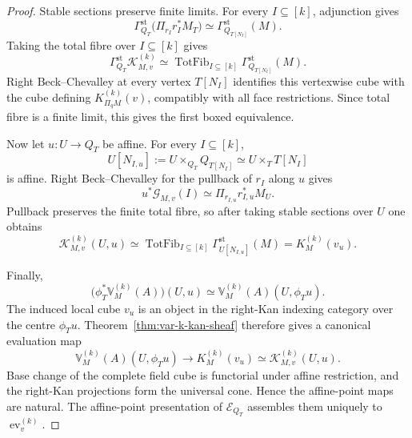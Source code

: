 \begin{proof}
Stable sections preserve finite limits. For every \(I\subseteq[k]\), adjunction gives
\[
    \Gamma_{Q_T}^{\mathrm{st}}
    \bigl(\Pi_{r_I}r_I^*M_T\bigr)
    \simeq
    \Gamma_{Q_{T[N_I]}}^{\mathrm{st}}(M).
\]
Taking the total fibre over \(I\subseteq[k]\) gives
\[
    \Gamma_{Q_T}^{\mathrm{st}}
    \mathscr K^{(k)}_{M,v}
    \simeq
    \operatorname{TotFib}_{I\subseteq[k]}
    \Gamma_{Q_{T[N_I]}}^{\mathrm{st}}(M).
\]
Right Beck--Chevalley at every vertex \(T[N_I]\) identifies this vertexwise cube with the cube defining \(K_{\Pi_qM}^{(k)}(v)\), compatibly with all face restrictions. Since total fibre is a finite limit, this gives the first boxed equivalence.

Now let \(u:U\to Q_T\) be affine. For every \(I\subseteq[k]\),
\[
    U[N_{I,u}]
    :=
    U\times_{Q_T}Q_{T[N_I]}
    \simeq
    U\times_TT[N_I]
\]
is affine. Right Beck--Chevalley for the pullback of \(r_I\) along \(u\) gives
\[
    u^*\mathscr G_{M,v}(I)
    \simeq
    \Pi_{r_{I,u}}r_{I,u}^*M_U.
\]
Pullback preserves the finite total fibre, so after taking stable sections over \(U\) one obtains
\[
    \mathscr K^{(k)}_{M,v}(U,u)
    \simeq
    \operatorname{TotFib}_{I\subseteq[k]}
    \Gamma_{U[N_{I,u}]}^{\mathrm{st}}(M)
    =
    K_M^{(k)}(v_u).
\]

Finally,
\[
    \bigl(\phi_T^*\mathbb V_M^{(k)}(A)\bigr)(U,u)
    \simeq
    \mathbb V_M^{(k)}(A)(U,\phi_Tu).
\]
The induced local cube \(v_u\) is an object in the right-Kan indexing category over the centre \(\phi_Tu\). Theorem~\ref{thm:var-k-kan-sheaf} therefore gives a canonical evaluation map
\[
    \mathbb V_M^{(k)}(A)(U,\phi_Tu)
    \longrightarrow
    K_M^{(k)}(v_u)
    \simeq
    \mathscr K^{(k)}_{M,v}(U,u).
\]
Base change of the complete field cube is functorial under affine restriction, and the right-Kan projections form the universal cone. Hence the affine-point maps are natural. The affine-point presentation of \(\mathcal E_{Q_T}\) assembles them uniquely to \(\operatorname{ev}^{(k)}_v\).
\end{proof}

